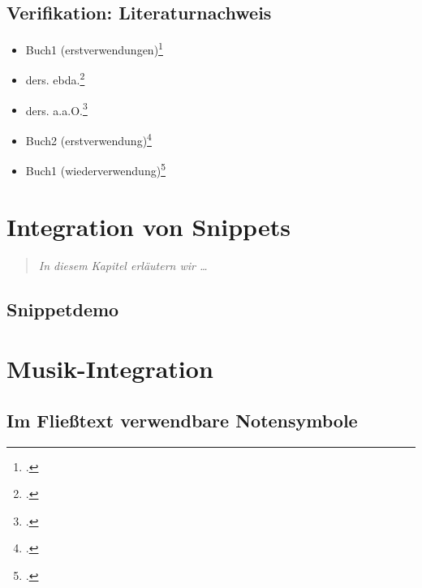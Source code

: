 \documentclass[
  DIV=calc,
  BCOR=5mm,
  11pt,
  headings=small,
  oneside,
  abstract=true,
  toc=bib,
  english,ngerman]{scrbook}
\begin{document}
\section{Verifikation: Literaturnachweis}
\begin{itemize}
  \item Buch1 (erstverwendungen)\footcite[vgl.][15]{Grabner1974a}
  \item ders. ebda.\footcite[vgl.][15]{Grabner1974a}
  \item ders. a.a.O.\footcite[vgl.][23]{Grabner1974a}
  \item Buch2 (erstverwendung)\footcite[vgl.][15]{Delamotte2011a}
  \item Buch1 (wiederverwendung)\footcite[vgl.][15]{Grabner1974a}
\end{itemize}

\chapter{Integration von Snippets}
\begin{quote}\itshape
In diesem Kapitel erläutern wir \ldots
\end{quote}

\section{Snippetdemo}


\chapter{Musik-Integration}

\section{Im Fließtext verwendbare Notensymbole}
\end{document}

